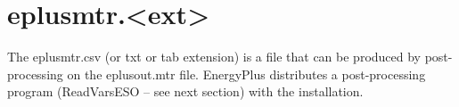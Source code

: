 \section{eplusmtr.\textless{}ext\textgreater{}}\label{eplusmtr.ext}

The eplusmtr.csv (or txt or tab extension) is a file that can be produced by post-processing on the eplusout.mtr file. EnergyPlus distributes a post-processing program (ReadVarsESO -- see next section) with the installation.
